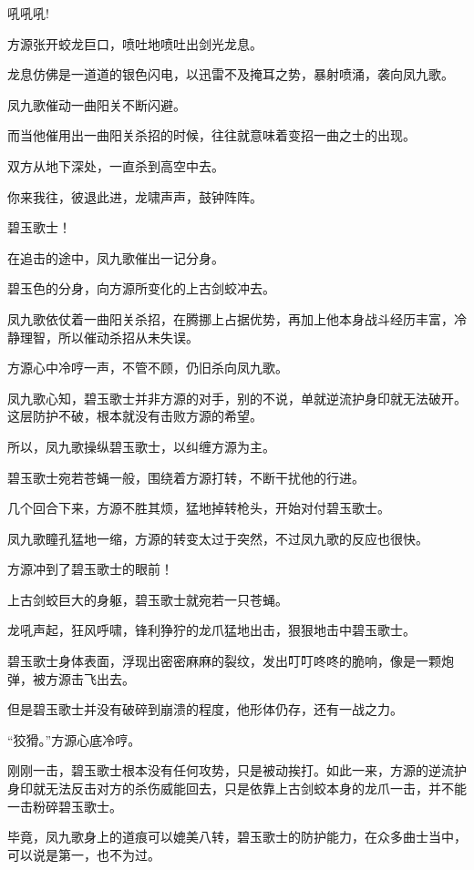 
\begin{this_body}

吼吼吼!

方源张开蛟龙巨口，喷吐地喷吐出剑光龙息。

龙息仿佛是一道道的银色闪电，以迅雷不及掩耳之势，暴射喷涌，袭向凤九歌。

凤九歌催动一曲阳关不断闪避。

而当他催用出一曲阳关杀招的时候，往往就意味着变招一曲之士的出现。

双方从地下深处，一直杀到高空中去。

你来我往，彼退此进，龙啸声声，鼓钟阵阵。

碧玉歌士！

在追击的途中，凤九歌催出一记分身。

碧玉色的分身，向方源所变化的上古剑蛟冲去。

凤九歌依仗着一曲阳关杀招，在腾挪上占据优势，再加上他本身战斗经历丰富，冷静理智，所以催动杀招从未失误。

方源心中冷哼一声，不管不顾，仍旧杀向凤九歌。

凤九歌心知，碧玉歌士并非方源的对手，别的不说，单就逆流护身印就无法破开。这层防护不破，根本就没有击败方源的希望。

所以，凤九歌操纵碧玉歌士，以纠缠方源为主。

碧玉歌士宛若苍蝇一般，围绕着方源打转，不断干扰他的行进。

几个回合下来，方源不胜其烦，猛地掉转枪头，开始对付碧玉歌士。

凤九歌瞳孔猛地一缩，方源的转变太过于突然，不过凤九歌的反应也很快。

方源冲到了碧玉歌士的眼前！

上古剑蛟巨大的身躯，碧玉歌士就宛若一只苍蝇。

龙吼声起，狂风呼啸，锋利狰狞的龙爪猛地出击，狠狠地击中碧玉歌士。

碧玉歌士身体表面，浮现出密密麻麻的裂纹，发出叮叮咚咚的脆响，像是一颗炮弹，被方源击飞出去。

但是碧玉歌士并没有破碎到崩溃的程度，他形体仍存，还有一战之力。

“狡猾。”方源心底冷哼。

刚刚一击，碧玉歌士根本没有任何攻势，只是被动挨打。如此一来，方源的逆流护身印就无法反击对方的杀伤威能回去，只是依靠上古剑蛟本身的龙爪一击，并不能一击粉碎碧玉歌士。

毕竟，凤九歌身上的道痕可以媲美八转，碧玉歌士的防护能力，在众多曲士当中，可以说是第一，也不为过。


\end{this_body}
